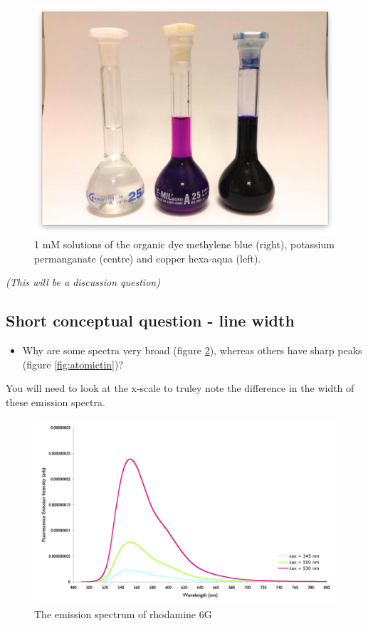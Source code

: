 \documentclass[
]{book}
\providecommand{\tightlist}{%
  \setlength{\itemsep}{0pt}\setlength{\parskip}{0pt}}
\begin{document}
\begin{figure}

{\centering \includegraphics[width=0.7\linewidth]{images/Molar_extinction_coefficients} 

}

\caption{1 mM solutions of the organic dye methylene blue (right), potassium permanganate (centre) and copper hexa-aqua (left).}\label{fig:molarextsolutions1}
\end{figure}

\emph{(This will be a discussion question)}

\hypertarget{subsec:linewidth}{%
\subsection{Short conceptual question - line width}\label{subsec:linewidth}}

\begin{itemize}
\tightlist
\item
  Why are some spectra very broad (figure \ref{fig:rhodaminemol}), whereas others have sharp peaks (figure \ref{fig:atomictin})?
\end{itemize}

You will need to look at the x-scale to truley note the difference in the width of these emission spectra.

\begin{figure}

{\centering \includegraphics[width=0.7\linewidth]{images/rhodamine6G} 

}

\caption{The emission spectrum of rhodamine 6G}\label{fig:rhodaminemol}
\end{figure}
\end{document}
